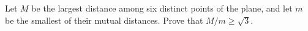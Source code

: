 Let $M$ be the largest distance among six distinct points of the plane, and let $m$ be the smallest of their mutual distances. Prove that $M/m \geq \sqrt{3}$.
